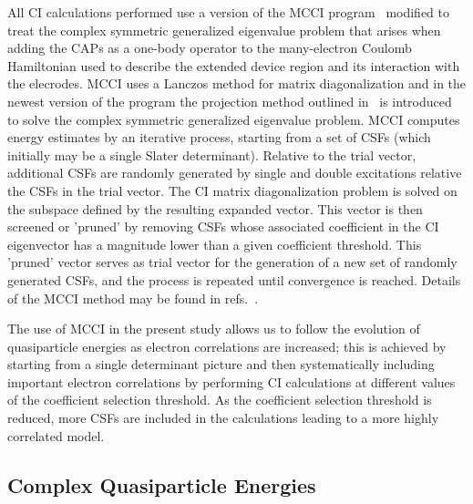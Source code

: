 All \ac{CI} calculations  performed use a version of the \ac{MCCI}
program~\cite{mcci1995, mcci1998} modified to treat the complex
symmetric generalized eigenvalue problem that arises when adding the
\ac{CAP}s as a one-body operator to the many-electron Coulomb
Hamiltonian used to describe the extended device region and its
interaction with the elecrodes. \ac{MCCI} uses a Lanczos method for
matrix diagonalization and in the newest version of the program the
projection method outlined in~\cite{tarantelli_csd} is introduced to
solve the complex symmetric generalized eigenvalue problem. \ac{MCCI}
computes energy estimates by an iterative process, starting from a set
of \acp{CSF} (which initially may be a single Slater determinant).
Relative to the trial vector, additional \acp{CSF} are randomly
generated by single and double excitations relative the \acp{CSF} in the
trial vector. The \ac{CI} matrix diagonalization problem is solved on
the subspace defined by the resulting expanded vector. This vector is
then screened or 'pruned' by removing \acp{CSF} whose associated coefficient
in the \ac{CI} eigenvector has a magnitude lower than a given coefficient
threshold. This 'pruned' vector serves as trial vector for the generation of
a new set of randomly generated \acp{CSF}, and the process is repeated until
convergence is reached. Details of the \ac{MCCI} method may be found
in refs.~\cite{mcci1995,mcci1998,mcci2000,multiref}.

The use of \ac{MCCI} in the present study allows us to follow the
evolution of quasiparticle energies as electron correlations are
increased; this is achieved by starting from a single determinant picture
and then systematically including important electron correlations by
performing \ac{CI} calculations at different values of the coefficient
selection threshold. As the coefficient selection threshold is reduced,
more \acp{CSF} are included in the calculations leading to a more highly
correlated model.

\subsection{Complex Quasiparticle Energies}

